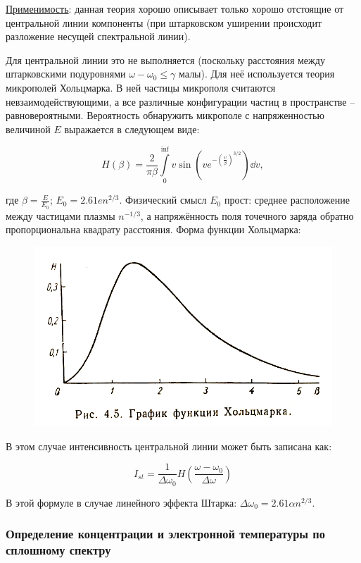 \documentclass[10pt, a4paper]{article}
\begin{document}
\uline{Применимость}: данная теория хорошо описывает только хорошо отстоящие от центральной линии компоненты (при штарковском уширении происходит разложение несущей спектральной линии).

Для центральной линии это не выполняется (поскольку расстояния между штарковскими подуровнями $\omega-\omega_0\leq\gamma$ малы).
Для неё используется теория микрополей Хольцмарка. В ней частицы микрополя считаются невзаимодействующими, а все различные конфигурации частиц в пространстве -- равновероятными. Вероятность обнаружить микрополе с напряженностью величиной $E$ выражается в следующем виде:

\begin{equation*}
	H(\beta) = \frac{2}{\pi \beta} \int\limits_{0}^{\inf} v \sin(v e^{- \left(\frac{v}{\beta}\right)^{3/2}}) \dd{v},
\end{equation*}

где $\beta = \frac{E}{E_0}$; $E_0 = 2.61 e n^{2/3}$. Физический смысл $E_0$ прост: среднее расположение между частицами плазмы ${n^{-1/3}}$, а напряжённость поля точечного заряда обратно пропорциональна квадрату расстояния. Форма функции Хольцмарка:

\begin{figure}[ht]
	\begin{center}
		\includegraphics[width=0.6\linewidth]{Holsmark.JPG}
	\end{center}
\end{figure}

В этом случае интенсивность центральной линии может быть записана как:

\begin{equation*}
	I_{st}=\frac{1}{\Delta \omega_0} H\left(\frac{\omega-\omega_0}{\Delta\omega}\right)
\end{equation*}

В этой формуле в случае линейного эффекта Штарка: $\Delta \omega_0 = 2.61 \alpha n^{2/3}$.

\subsubsection{Определение концентрации и электронной температуры по сплошному спектру}
\end{document}
